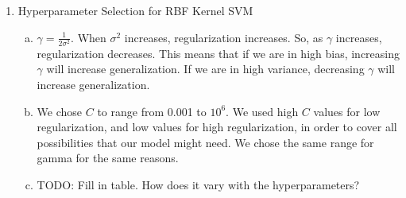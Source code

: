 \documentclass[11pt]{article}
\begin{document}
\begin{enumerate}[(2)]
\begin{enumerate}[(b)]
\end{enumerate}
\item Hyperparameter Selection for RBF Kernel SVM
\begin{enumerate}[(a)]
\item $\gamma = \frac{1}{2\sigma^2}$. When $\sigma^2$ increases, regularization increases. So, as $\gamma$
increases, regularization decreases. This means that if we are in high bias, increasing $\gamma$ will 
increase generalization. If we are in high variance, decreasing $\gamma$ will increase generalization. 
\item We chose $C$ to range from 0.001 to $10^6$. We used high $C$ values for low regularization, and 
low values for high regularization, in order to cover all possibilities that our model might need. We chose
the same range for gamma for the same reasons. 
\item TODO: Fill in table. How does it vary with the hyperparameters?


\end{enumerate}
\end{enumerate}
\end{document}
